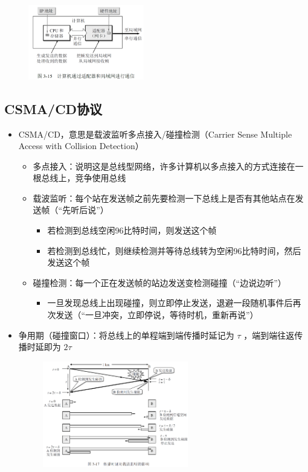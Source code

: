 \documentclass[cs4size,a4paper,10pt]{ctexart}
\begin{document}
	\begin{figure}[H]
		\centering
		\includegraphics[width=0.45\textwidth]{img/3.15}
	\end{figure}

	\subsection{CSMA/CD协议}
	\begin{itemize}
		\item CSMA/CD，意思是载波监听多点接入/碰撞检测（Carrier Sense Multiple Access with Collision Detection）
		\begin{itemize}
			\item 多点接入：说明这是总线型网络，许多计算机以多点接入的方式连接在一根总线上，竞争使用总线
			\item 载波监听：每个站在发送帧之前先要检测一下总线上是否有其他站点在发送帧（“先听后说”）
			\begin{itemize}
				\item 若检测到总线空闲96比特时间，则发送这个帧
				\item 若检测到总线忙，则继续检测并等待总线转为空闲96比特时间，然后发送这个帧
			\end{itemize}
			\item 碰撞检测：每一个正在发送帧的站边发送变检测碰撞（“边说边听”）
			\begin{itemize}
				\item 一旦发现总线上出现碰撞，则立即停止发送，退避一段随机事件后再次发送（“一旦冲突，立即停说，等待时机，重新再说”）
			\end{itemize}
		\end{itemize}
		\item 争用期（碰撞窗口）：将总线上的单程端到端传播时延记为 $\tau$ ，端到端往返传播时延即为 $2\tau$
		\begin{figure}[H]
			\centering
			\includegraphics[width=0.6\textwidth]{img/3.17}

\end{figure}
\end{itemize}
\end{document}
